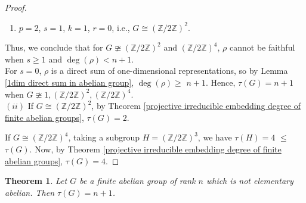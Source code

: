 \documentclass[a4paper,11pt]{amsart}
\numberwithin{equation}{section}
\numberwithin{equation}{subsection}
\newtheorem{theorem}{Theorem}[section]
\newcommand{\Z}{\mathbb{Z}}
\newcommand{\tg}{\tau(G)}
\newcommand{\poonam}[1]{{\color{blue} #1}}
\begin{document}
\begin{proof}
\begin{enumerate}
		\item $p=2$, $s=1$, $k=1$, $r=0$, i.e., $G \cong (\Z/2\Z)^2$.  %
	\end{enumerate}
	Thus, we conclude that for $G \ncong (\Z/2\Z)^2$ and $(\Z/2\Z)^4$, $\rho$ cannot be faithful when $s \geq 1$ and $\operatorname{deg}(\rho) < n+1$. \\
	For $s=0$, $\rho$ is a direct sum of one-dimensional representations, so by Lemma \ref{1dim direct sum in abelian group}, $\operatorname{deg}(\rho) \geq$ $n+1$. Hence, $\tg = n + 1$ when $G \ncong 1, (\Z/2\Z)^2, (\Z/2\Z)^4$. \\
	
	$(ii)$ If $G \cong (\Z/2\Z)^2$, by Theorem \ref{projective irreducible embedding degree of finite abelian groups}, $\tg=2$. 
	
	If $G \cong (\Z/2\Z)^4$, taking a subgroup $H =(\Z/2\Z)^3$, we have $\tau(H) = 4$ $\leq $ $\tg$. Now, by Theorem \ref{projective irreducible embedding degree of finite abelian groups}, $\tg = 4$.
	
\end{proof}

\begin{theorem}\label{projective embedding degree of finite abelian groups}
	Let $G$ be a finite abelian group of rank $n$ which is not elementary abelian. Then $\tau(G) = n + 1$.
	
\end{theorem}
\end{document}
